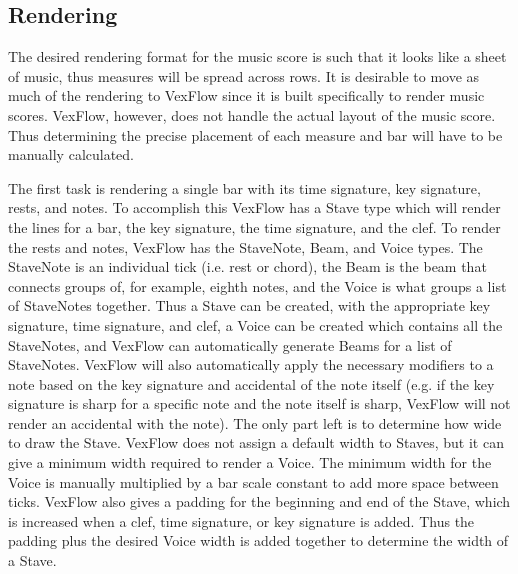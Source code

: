\documentclass[letterpaper,12pt]{article}
\begin{document}
\subsection{Rendering}

The desired rendering format for the music score is such that it looks like a sheet of music, thus measures will be
spread across rows. It is desirable to move as much of the rendering to VexFlow since it is built specifically to render
music scores. VexFlow, however, does not handle the actual layout of the music score. Thus determining the precise 
placement of each measure and bar will have to be manually calculated. 

The first task is rendering a single bar with its time signature, key signature, rests, and notes. To accomplish this
VexFlow has a Stave type which will render the lines for a bar, the key signature, the time signature, and the clef. To
render the rests and notes, VexFlow has the StaveNote, Beam, and Voice types. The StaveNote is an individual tick (i.e.
rest or chord), the Beam is the beam that connects groups of, for example, eighth notes, and the Voice is what groups a
list of StaveNotes together. Thus a Stave can be created, with the appropriate key signature, time signature, and clef,
a Voice can be created which contains all the StaveNotes, and VexFlow can automatically generate Beams for a list of
StaveNotes. VexFlow will also automatically apply the necessary modifiers to a note based on the key signature and
accidental of the note itself (e.g. if the key signature is sharp for a specific note and the note itself is sharp,
VexFlow will not render an accidental with the note). The only part left is to determine how wide to draw the Stave.
VexFlow does not assign a default width to Staves, but it can give a minimum width required to render a Voice. The
minimum width for the Voice is manually multiplied by a bar scale constant to add more space between ticks. VexFlow also
gives a padding for the beginning and end of the Stave, which is increased when a clef, time signature, or key signature
is added. Thus the padding plus the desired Voice width is added together to determine the width of a Stave.
\end{document}
